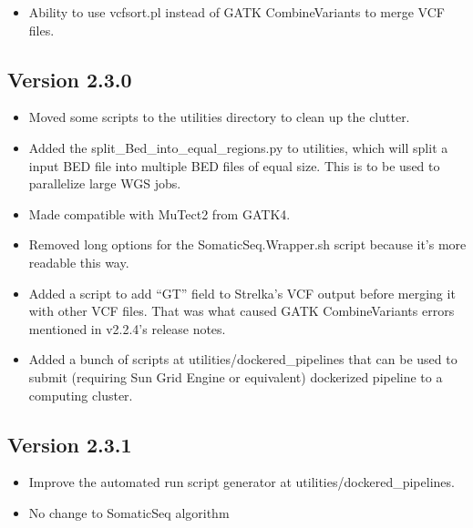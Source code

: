 \documentclass[10pt,letterpaper]{article}
\begin{document}
\begin{sloppypar}
\begin{itemize}
  \item
  Ability to use vcfsort.pl instead of GATK CombineVariants to merge VCF files.

\end{itemize}


\subsection{Version 2.3.0}

\begin{itemize}
  
  \item
  Moved some scripts to the utilities directory to clean up the clutter.
  
  \item
  Added the split\_Bed\_into\_equal\_regions.py to utilities, which will split a input BED file into multiple BED files of equal size. This is to be used to parallelize large WGS jobs.
  
  \item
  Made compatible with MuTect2 from GATK4.
  
  \item
  Removed long options for the SomaticSeq.Wrapper.sh script because it's more readable this way.
  
  \item
  Added a script to add ``GT'' field to Strelka's VCF output before merging it with other VCF files. That was what caused GATK CombineVariants errors mentioned in v2.2.4's release notes. 
  
  \item
  Added a bunch of scripts at utilities/dockered\_pipelines that can be used to submit (requiring Sun Grid Engine or equivalent) dockerized pipeline to a computing cluster. 

\end{itemize}


\subsection{Version 2.3.1}

\begin{itemize}

  \item
  Improve the automated run script generator at utilities/dockered\_pipelines.
  
  \item
  No change to SomaticSeq algorithm


\end{itemize}
\end{sloppypar}
\end{document}
